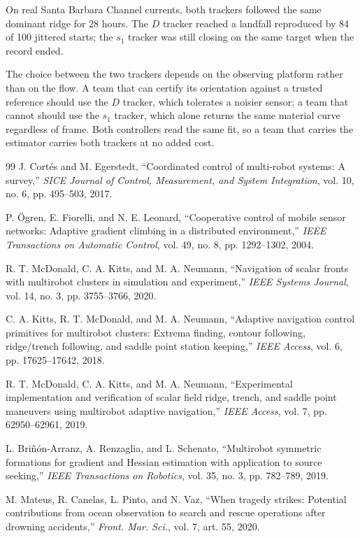 \documentclass[lettersize,journal]{IEEEtran}
\begin{document}
On real Santa Barbara Channel currents, both trackers followed the same
dominant ridge for 28 hours. The $D$ tracker reached a landfall
reproduced by 84 of 100 jittered starts; the $s_1$ tracker was still
closing on the same target when the record ended.

The choice between the two trackers depends on the observing platform
rather than on the flow. A team that can certify its orientation
against a trusted reference should use the $D$ tracker, which tolerates
a noisier sensor; a team that cannot should use the $s_1$ tracker,
which alone returns the same material curve regardless of frame. Both
controllers read the same fit, so a team that carries the estimator
carries both trackers at no added cost.

\begin{thebibliography}{99}
 J. Cortés and M. Egerstedt, ``Coordinated control of multi-robot
systems: A survey,'' \textit{SICE Journal of Control, Measurement, and
System Integration}, vol. 10, no. 6, pp. 495--503, 2017.

 P. Ögren, E. Fiorelli, and N. E. Leonard, ``Cooperative control
of mobile sensor networks: Adaptive gradient climbing in a distributed
environment,'' \textit{IEEE Transactions on Automatic Control}, vol. 49, no. 8,
pp. 1292--1302, 2004.

 R. T. McDonald, C. A. Kitts, and M. A. Neumann, ``Navigation of
scalar fronts with multirobot clusters in simulation and experiment,''
\textit{IEEE Systems Journal}, vol. 14, no. 3, pp. 3755--3766, 2020.

 C. A. Kitts, R. T. McDonald, and M. A. Neumann, ``Adaptive
navigation control primitives for multirobot clusters: Extrema finding,
contour following, ridge/trench following, and saddle point station keeping,''
\textit{IEEE Access}, vol. 6, pp. 17625--17642, 2018.

 R. T. McDonald, C. A. Kitts, and M. A. Neumann, ``Experimental
implementation and verification of scalar field ridge, trench, and saddle
point maneuvers using multirobot adaptive navigation,'' \textit{IEEE Access},
vol. 7, pp. 62950--62961, 2019.

 L. Briñón-Arranz, A. Renzaglia, and L. Schenato, ``Multirobot
symmetric formations for gradient and Hessian estimation with application to
source seeking,'' \textit{IEEE Transactions on Robotics}, vol. 35, no. 3,
pp. 782--789, 2019.

 M. Mateus, R. Canelas, L. Pinto, and N. Vaz, ``When
tragedy strikes: Potential contributions from ocean observation to
search and rescue operations after drowning accidents,'' \textit{Front.
Mar. Sci.}, vol. 7, art. 55, 2020.


\end{thebibliography}
\end{document}
